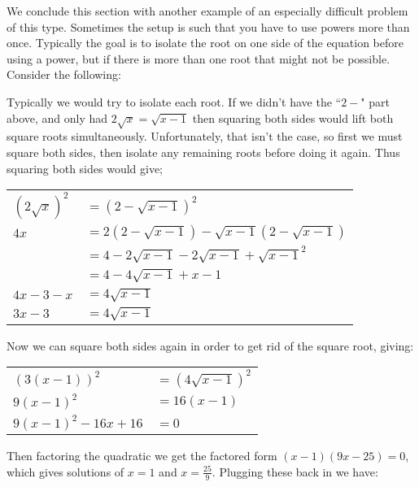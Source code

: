 \documentclass{ximera}
\begin{document}
    We conclude this section with another example of an especially difficult problem of this type. Sometimes the setup is such that you have to use powers more than once. Typically the goal is to isolate the root on one side of the equation before using a power, but if there is more than one root that might not be possible. Consider the following:

    \begin{example}[Find all $x$ that satisfy the equation $2\sqrt{x} = 2 - \sqrt{x - 1}$]%
        Typically we would try to isolate each root. If we didn't have the ``$2 -$" part above, and only had $2\sqrt{x} = \sqrt{x - 1}$ then squaring both sides would lift both square roots simultaneously. Unfortunately, that isn't the case, so first we must square both sides, then isolate any remaining roots before doing it again. Thus squaring both sides would give;\\
        \begin{center}
            \begin{tabular}{ll}
                $(2\sqrt{x})^2$ &$= (2 - \sqrt{x - 1})^2$                                   \\
                $4x$            &$= 2(2 - \sqrt{x - 1}) - \sqrt{x - 1}(2 - \sqrt{x - 1})$   \\
                                &$= 4 - 2\sqrt{x - 1} - 2\sqrt{x - 1} + \sqrt{x - 1}^2$     \\
                                &$= 4 - 4\sqrt{x - 1} + x - 1$                              \\
                $4x - 3 - x $   &$= 4\sqrt{x - 1}$                                          \\
                $3x - 3$        &$= 4\sqrt{x - 1}$
            \end{tabular}
        \end{center}
        Now we can square both sides again in order to get rid of the square root, giving:
        \begin{center}
            \begin{tabular}{ll}
                $(3(x-1))^2$            & $ = (4\sqrt{x - 1})^2$    \\
                $ 9(x-1)^2 $            & $= 16(x - 1)$             \\
                $9(x-1)^2 - 16x + 16$   & $ = 0$
            \end{tabular}
        \end{center}
        Then factoring the quadratic we get the factored form $(x-1)(9x-25) = 0$, which gives solutions of $x = 1$ and $x = \frac{25}{9}$. Plugging these back in we have:


\end{example}
\end{document}
